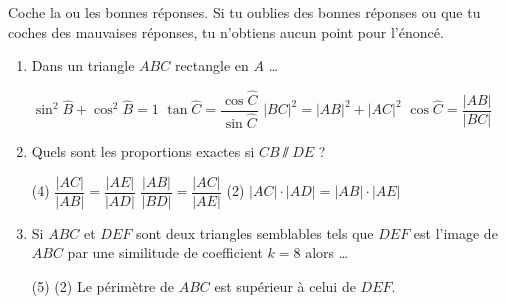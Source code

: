 %
%
    Coche la ou les bonnes réponses. Si tu oublies des bonnes réponses ou que tu coches des mauvaises réponses, tu n'obtiens aucun point pour l'énoncé.
    \begin{enumerate}
        \item Dans un triangle $ABC$ rectangle en $A$ \dots
              \begin{QCM}
                  \choice $\sin^2\widehat{B} + \cos^2\widehat{B}=1$
                  \choice $\tan\widehat{C} = \dfrac{\cos\widehat{C}}{\sin\widehat{C}}$
                  \choice $|BC|^2 = |AB|^2 + |AC|^2$
                  \choice $\cos\widehat{C}=\dfrac{|AB|}{|BC|}$
              \end{QCM}
        \item Quels sont les proportions exactes si $CB\sslash DE$ ? 
              \begin{QCM}(4)
                  \choice $\dfrac{|AC|}{|AB|}=\dfrac{|AE|}{|AD|}$
                  \choice $\dfrac{|AB|}{|BD|}=\dfrac{|AC|}{|AE|}$
                  \choice*(2) $|AC|\cdot |AD| = |AB| \cdot |AE|$
              \end{QCM}
        \item Si $ABC$ et $DEF$ sont deux triangles semblables tels que $DEF$ est l'image de $ABC$ par une similitude de coefficient $k=8$ alors \dots
              \begin{QCM}(5)
                  \choice*(2) Le périmètre de $ABC$ est supérieur à celui de $DEF$.

\end{QCM}
\end{enumerate}
